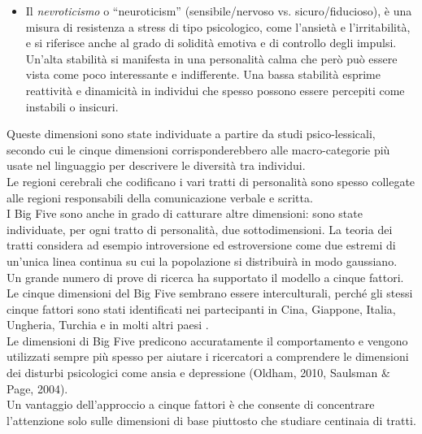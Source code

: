 \begin{itemize}
	\item Il \emph{nevroticismo} o ``neuroticism'' (sensibile/nervoso vs. sicuro/fiducioso), è una misura di resistenza a stress di tipo psicologico, come l'ansietà e l'irritabilità, e si riferisce anche al grado di solidità emotiva e di controllo degli impulsi.\\
	Un'alta stabilità si manifesta in una personalità calma che però può essere vista come poco interessante e indifferente. Una bassa stabilità esprime reattività e dinamicità in individui che spesso possono essere percepiti come instabili o insicuri. 
\end{itemize}
Queste dimensioni sono state individuate a partire da studi psico-lessicali, secondo cui le cinque dimensioni corrisponderebbero alle macro-categorie più usate nel linguaggio per descrivere le diversità tra individui.\\
Le regioni cerebrali che codificano i vari tratti di personalità sono spesso collegate alle regioni responsabili della comunicazione verbale e scritta. \\
I Big Five sono anche in grado di catturare altre dimensioni: sono state individuate, per ogni tratto di personalità, due sottodimensioni.
La teoria dei tratti considera ad esempio introversione ed estroversione come due estremi di un'unica linea continua su cui la popolazione si distribuirà in modo gaussiano.\\
Un grande numero di prove di ricerca ha supportato il modello a cinque fattori. Le cinque dimensioni del Big Five sembrano essere interculturali, perché gli stessi cinque fattori sono stati identificati nei partecipanti in Cina, Giappone, Italia, Ungheria, Turchia e in molti altri paesi \cite{triandis2002cultural}.\\ 
Le dimensioni di Big Five predicono accuratamente il comportamento e vengono utilizzati sempre più spesso per aiutare i ricercatori a comprendere le dimensioni dei disturbi psicologici come ansia e depressione (Oldham, 2010, Saulsman \& Page, 2004)\cite{saulsman2004five}.\\
Un vantaggio dell'approccio a cinque fattori è che consente di concentrare l'attenzione solo sulle dimensioni di base piuttosto che studiare centinaia di tratti.
